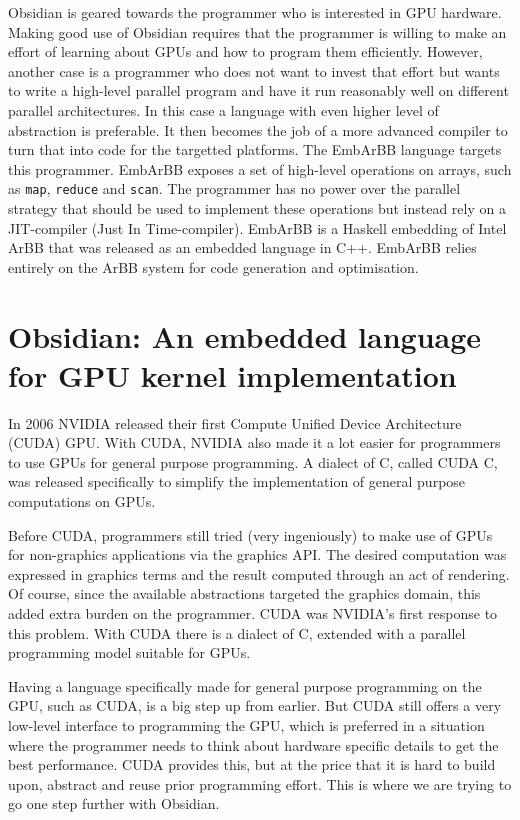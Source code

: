\documentclass[a4paper]{book}
\begin{document}
Obsidian is geared towards the programmer who is interested in GPU hardware. Making 
good use of Obsidian requires that the programmer is willing to make an effort 
of learning about GPUs and how to program them efficiently. However, another case 
is a programmer who does not want to invest that effort but wants to write a high-level 
parallel program and have it run reasonably well on different parallel architectures. 
In this case a language with even higher level of abstraction is preferable. It then 
becomes the job of a more advanced compiler to turn that into code for the targetted 
platforms. The EmbArBB language targets this programmer. EmbArBB exposes a set of high-level 
operations on arrays, such as {\tt map}, {\tt reduce} and {\tt scan}. The programmer 
has no power over the parallel strategy that should be used to implement these 
operations but instead rely on a JIT-compiler (Just In Time-compiler). EmbArBB is a 
Haskell embedding of Intel ArBB that was released as an embedded language in C++. 
EmbArBB relies entirely on the ArBB system for code generation and optimisation.  


\section {Obsidian: An embedded language for GPU kernel implementation} 

In 2006 NVIDIA released their first Compute Unified Device Architecture (CUDA) 
GPU. With CUDA, NVIDIA also made it a lot easier for programmers to use GPUs
for general purpose programming. A dialect of C, called CUDA C, was released 
specifically to simplify the implementation of general purpose computations on GPUs. 

Before CUDA, programmers still tried (very ingeniously) to make use of GPUs for 
non-graphics applications via the graphics API. The desired computation was expressed 
in graphics terms and the result computed through an act of rendering. Of course, since the 
available abstractions targeted the graphics domain, this added extra
burden on the programmer. CUDA was NVIDIA's first response to this problem. With CUDA 
there is a dialect of C, extended with a parallel programming model suitable for GPUs. 

Having a language specifically made for general purpose programming on the GPU, such as 
CUDA, is a big step up from earlier. But CUDA still offers a very low-level interface to 
programming the GPU, which is preferred in a situation where the programmer needs to 
think about hardware specific details to get the best performance. CUDA provides this, 
but at the price that it is hard to build upon, abstract and reuse prior programming 
effort. This is where we are trying to go one step further with Obsidian. 
\end{document}
